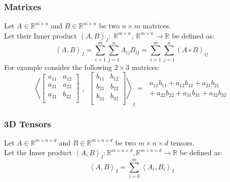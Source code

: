 \documentclass[12pt]{article}
\begin{document}
\subsubsection{Matrixes}
Let \(A\in \mathbb{R}^{m \times n}\) and \(B\in \mathbb{R}^{m \times n}\) be two \(n \times m\) matrices. \\Let their Inner product \(\left<A, B\right>_I:\; \mathbb{R}^{m \times n},~\mathbb{R}^{m \times n} \to \mathbb{R}\) be defined as:
\begin{equation} \label{eq:defs:Inner_product}
\left<A, B\right>_I = \sum_{i=1}^{m}\sum_{j=1}^{n} A_{ij}B_{ij} = \sum_{i=1}^{m}\sum_{j=1}^{n} (A \circ B)_{ij}
\end{equation}
For example consider the following \(2 \times 3\) matrices:
\[
\left<
\begin{bmatrix}
a_{11} & a_{12} \\
a_{21} & a_{22} \\
a_{31} & b_{32} \\
\end{bmatrix}
\begin{matrix} \\\\,\end{matrix}~
\begin{bmatrix}
b_{11} & b_{12} \\
b_{21} & b_{22} \\
b_{31} & b_{32} \\
\end{bmatrix}\right>_I
= \;
\begin{array}{ll}
     a_{11}b_{11} + a_{12}b_{12} + a_{21}b_{21}\\
+~a_{22}b_{22} + a_{31}b_{31} + a_{32}b_{32} 
\end{array}
\]

\subsubsection{3D Tensors}
Let \(A \in \mathbb{R}^{m \times n \times d}\) and \(B \in \mathbb{R}^{m \times n \times d}\) be two \(m \times n \times d\) tensors.\\
Let the Inner product \(\left<A, B\right>_I : \mathbb{R}^{m \times n \times d}, \mathbb{R}^{m \times n \times d} \to \mathbb{R}\) be defined as:
\begin{equation}\label{eq:defs:Inner_product_3d}
\left<A, B\right>_I = \sum_{i=0}^{m} \left<A_{i}, B_{i}\right>_I
\end{equation}
\end{document}
